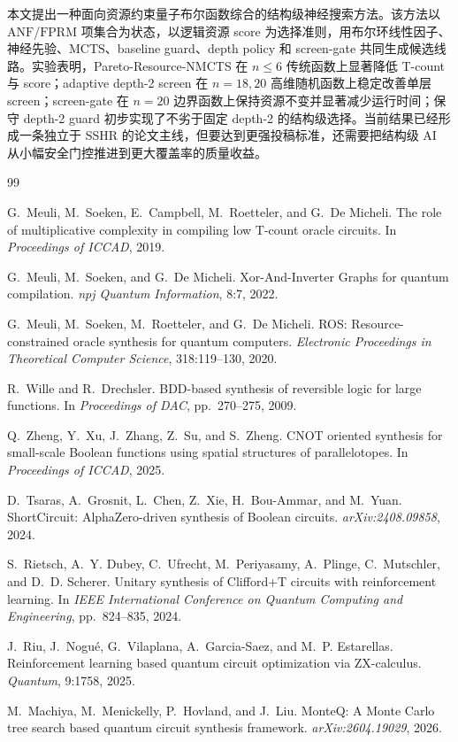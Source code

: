 \documentclass[UTF8,fontset=macnew,11pt]{ctexart}
\newcommand{\pareto}{Pareto-Resource-NMCTS}
\newcommand{\anf}{\ensuremath{\mathrm{ANF}}}
\newcommand{\fprm}{\ensuremath{\mathrm{FPRM}}}
\newcommand{\mcts}{\ensuremath{\mathrm{MCTS}}}
\begin{document}
本文提出一种面向资源约束量子布尔函数综合的结构级神经搜索方法。该方法以 \anf{}/\fprm{} 项集合为状态，以逻辑资源 score 为选择准则，用布尔环线性因子、神经先验、\mcts{}、baseline guard、depth policy 和 screen-gate 共同生成候选线路。实验表明，\pareto{} 在 $n\leq6$ 传统函数上显著降低 T-count 与 score；adaptive depth-2 screen 在 $n=18,20$ 高维随机函数上稳定改善单层 screen；screen-gate 在 $n=20$ 边界函数上保持资源不变并显著减少运行时间；保守 depth-2 guard 初步实现了不劣于固定 depth-2 的结构级选择。当前结果已经形成一条独立于 SSHR 的论文主线，但要达到更强投稿标准，还需要把结构级 AI 从小幅安全门控推进到更大覆盖率的质量收益。

\begin{thebibliography}{99}

G.~Meuli, M.~Soeken, E.~Campbell, M.~Roetteler, and G.~De Micheli.
\newblock The role of multiplicative complexity in compiling low T-count oracle circuits.
\newblock In \emph{Proceedings of ICCAD}, 2019.

G.~Meuli, M.~Soeken, and G.~De Micheli.
\newblock Xor-And-Inverter Graphs for quantum compilation.
\newblock \emph{npj Quantum Information}, 8:7, 2022.

G.~Meuli, M.~Soeken, M.~Roetteler, and G.~De Micheli.
\newblock ROS: Resource-constrained oracle synthesis for quantum computers.
\newblock \emph{Electronic Proceedings in Theoretical Computer Science}, 318:119--130, 2020.

R.~Wille and R.~Drechsler.
\newblock BDD-based synthesis of reversible logic for large functions.
\newblock In \emph{Proceedings of DAC}, pp.~270--275, 2009.

Q.~Zheng, Y.~Xu, J.~Zhang, Z.~Su, and S.~Zheng.
\newblock CNOT oriented synthesis for small-scale Boolean functions using spatial structures of parallelotopes.
\newblock In \emph{Proceedings of ICCAD}, 2025.

D.~Tsaras, A.~Grosnit, L.~Chen, Z.~Xie, H.~Bou-Ammar, and M.~Yuan.
\newblock ShortCircuit: AlphaZero-driven synthesis of Boolean circuits.
\newblock \emph{arXiv:2408.09858}, 2024.

S.~Rietsch, A.~Y. Dubey, C.~Ufrecht, M.~Periyasamy, A.~Plinge, C.~Mutschler, and D.~D. Scherer.
\newblock Unitary synthesis of Clifford+T circuits with reinforcement learning.
\newblock In \emph{IEEE International Conference on Quantum Computing and Engineering}, pp.~824--835, 2024.

J.~Riu, J.~Nogu{\'e}, G.~Vilaplana, A.~Garcia-Saez, and M.~P. Estarellas.
\newblock Reinforcement learning based quantum circuit optimization via ZX-calculus.
\newblock \emph{Quantum}, 9:1758, 2025.

M.~Machiya, M.~Menickelly, P.~Hovland, and J.~Liu.
\newblock MonteQ: A Monte Carlo tree search based quantum circuit synthesis framework.
\newblock \emph{arXiv:2604.19029}, 2026.

\end{thebibliography}
\end{document}
